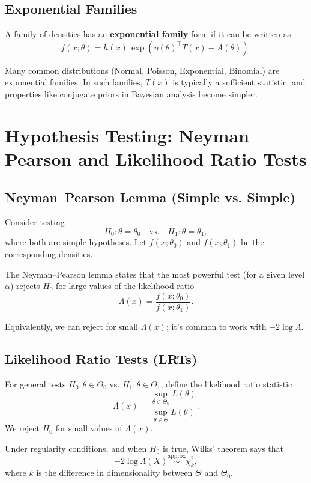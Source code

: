 \documentclass[11pt,a4paper]{article}
\begin{document}
\subsection{Exponential Families}

A family of densities has an \textbf{exponential family} form if it can be written as
\[
f(x;\theta) = h(x)\, \exp\left(\eta(\theta)^\top T(x) - A(\theta)\right).
\]

Many common distributions (Normal, Poisson, Exponential, Binomial) are exponential families. 
In such families, $T(x)$ is typically a sufficient statistic, and properties like conjugate priors in Bayesian analysis become simpler.

\newpage

\section{Hypothesis Testing: Neyman–Pearson and Likelihood Ratio Tests}
\label{sec:tests}

\subsection{Neyman–Pearson Lemma (Simple vs. Simple)}

Consider testing
\[
H_0: \theta = \theta_0 \quad \text{vs.} \quad H_1: \theta = \theta_1,
\]
where both are simple hypotheses. 
Let $f(x;\theta_0)$ and $f(x;\theta_1)$ be the corresponding densities.

The Neyman–Pearson lemma states that the most powerful test (for a given level $\alpha$) rejects $H_0$ for large values of the likelihood ratio
\[
\Lambda(x) = \frac{f(x;\theta_0)}{f(x;\theta_1)}.
\]

Equivalently, we can reject for small $\Lambda(x)$; it's common to work with $-2\log\Lambda$.

\subsection{Likelihood Ratio Tests (LRTs)}

For general tests $H_0:\theta \in \Theta_0$ vs. $H_1:\theta \in \Theta_1$, define the likelihood ratio statistic
\[
\Lambda(x) = \frac{\sup_{\theta \in \Theta_0} L(\theta)}{\sup_{\theta \in \Theta} L(\theta)}.
\]
We reject $H_0$ for small values of $\Lambda(x)$.

Under regularity conditions, and when $H_0$ is true, Wilks' theorem says that
\[
-2\log\Lambda(X) \overset{\text{approx}}{\sim} \chi^2_{k},
\]
where $k$ is the difference in dimensionality between $\Theta$ and $\Theta_0$.
\end{document}
